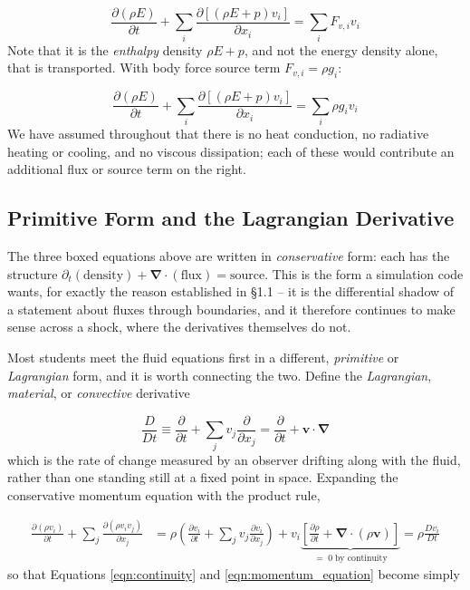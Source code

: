 \documentclass[notoc]{tufte-handout}
\renewcommand{\vec}[1]{\mathbf{#1}}
\newcommand{\del}{\vec{\nabla}}
\begin{document}
\begin{equation}
\boxed {\frac{\partial (\rho E)}{\partial t} + \sum_i  \frac{\partial \left[ (\rho E + p)v_i \right]}{\partial x_i} = \sum_i F_{v,i}  v_i }
\label {eqn:energy_equation}
\end{equation}
%
Note that it is the {\it enthalpy} density $\rho E + p$, and not the energy density alone, that is transported. With body force source term $F_{v,i} = \rho g_i$:

\begin{equation}
{\frac{\partial (\rho E)}{\partial t} + \sum_i  \frac{\partial \left[ (\rho E + p)v_i \right]}{\partial x_i} = \sum_i  \rho g_i v_i }
\end{equation}
%
We have assumed throughout that there is no heat conduction, no radiative heating or cooling, and no viscous dissipation; each of these would contribute an additional flux or source term on the right.

\subsection{Primitive Form and the Lagrangian Derivative}

The three boxed equations above are written in {\it conservative} form: each has the structure $\partial_t (\text{density}) + \del \cdot (\text{flux}) = \text{source}$. This is the form a simulation code wants, for exactly the reason established in \S 1.1 -- it is the differential shadow of a statement about fluxes through boundaries, and it therefore continues to make sense across a shock, where the derivatives themselves do not.

Most students meet the fluid equations first in a different, {\it primitive} or {\it Lagrangian} form, and it is worth connecting the two. Define the {\it Lagrangian}, {\it material}, or {\it convective} derivative

\begin{equation}
\frac{D}{Dt} \equiv \frac{\partial}{\partial t} + \sum_j v_j \frac{\partial}{\partial x_j} = \frac{\partial}{\partial t} + \vec{v}\cdot\del
\label{eqn:lagrangian_derivative}
\end{equation}
%
which is the rate of change measured by an observer drifting along with the fluid, rather than one standing still at a fixed point in space. Expanding the conservative momentum equation with the product rule,

\begin{align}
\frac{\partial(\rho v_i)}{\partial t} + \sum_j \frac{\partial (\rho v_i v_j)}{\partial x_j} & = \rho \left( \frac{\partial v_i}{\partial t} + \sum_j v_j \frac{\partial v_i}{\partial x_j} \right) + v_i \underbrace{\left[ \frac{\partial \rho}{\partial t} + \del\cdot(\rho\vec{v}) \right]}_{= \; 0 \; \text{by continuity}} = \rho \frac{D v_i}{Dt}
\end{align}
%
so that Equations \ref{eqn:continuity} and \ref{eqn:momentum_equation} become simply
\end{document}
